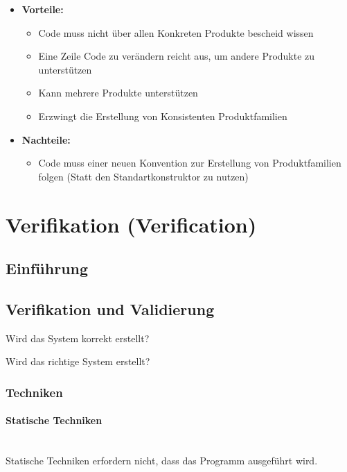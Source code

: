 \documentclass[
    ngerman,
    color=3b,
    summary,
    boxarc,
    main,
]{rubos-tuda-template}
\begin{document}
\begin{itemize}
    \item \textbf{Vorteile:}\begin{itemize}
              \item Code muss nicht über allen Konkreten Produkte bescheid wissen
              \item Eine Zeile Code zu verändern reicht aus, um andere Produkte zu unterstützen
              \item Kann mehrere Produkte unterstützen
              \item Erzwingt die Erstellung von Konsistenten Produktfamilien
          \end{itemize}
    \item \textbf{Nachteile:}\begin{itemize}
              \item Code muss einer neuen Konvention zur Erstellung von Produktfamilien folgen (Statt den Standartkonstruktor zu nutzen)
          \end{itemize}
\end{itemize}

\clearpage
\section{Verifikation (Verification)}
\subsection{Einführung}

\subsection{Verifikation und Validierung}
\begin{definition}[Verifikation]
    Wird das System korrekt erstellt?
\end{definition}
\begin{definition}[Validierung]
    Wird das richtige System erstellt?
\end{definition}

\subsubsection{Techniken}
\paragraph{Statische Techniken}\mbox{}\\
Statische Techniken erfordern nicht, dass das Programm ausgeführt wird.
\end{document}
